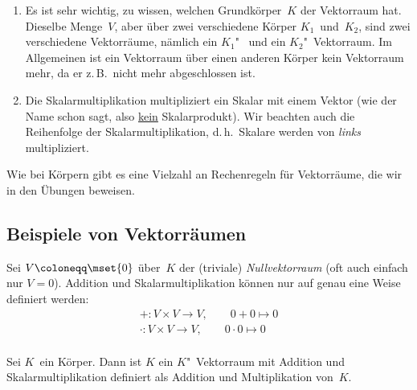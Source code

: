 \documentclass[a4paper]{article}
\begin{document}
\begin{remark}\leavevmode
    \begin{enumerate}
        \item Es ist sehr wichtig, zu wissen, welchen Grundkörper~$K$ der Vektorraum hat. Dieselbe Menge~$V$, aber über zwei verschiedene Körper $K_1$~und~$K_2$, sind zwei verschiedene Vektorräume, nämlich ein $K_1$"~ und ein $K_2$"~Vektorraum. Im Allgemeinen ist ein Vektorraum über einen anderen Körper kein Vektorraum mehr, da er z.\,B.\ nicht mehr abgeschlossen ist.
        \item Die Skalarmultiplikation multipliziert ein Skalar mit einem Vektor (wie der Name schon sagt, also \underline{kein} Skalarprodukt). Wir beachten auch die Reihenfolge der Skalarmultiplikation, d.\,h.\ Skalare werden von \emph{links} multipliziert.
    \end{enumerate}
\end{remark}

Wie bei Körpern gibt es eine Vielzahl an Rechenregeln für Vektorräume, die wir in den Übungen beweisen.

\subsection{Beispiele von Vektorräumen}

\begin{notation}[Nullvektorraum]
    Sei $V \coloneqq \mset{0}$ über~$K$ der (triviale) \emph{Nullvektorraum} (oft auch einfach nur $V = 0$). Addition und Skalarmultiplikation können nur auf genau eine Weise definiert werden:
    \begin{gather*}
        +\colon V\times V \to V,\qquad 0+0 \mapsto 0 \\
        \cdot\colon V\times V \to V,\qquad 0\cdot0 \mapsto 0 \\
    \end{gather*}
\end{notation}

\begin{example}
    Sei $K$~ein Körper. Dann ist $K$ ein $K$"~Vektorraum mit Addition und Skalarmultiplikation definiert als Addition und Multiplikation von~$K$.
\end{example}
\end{document}
